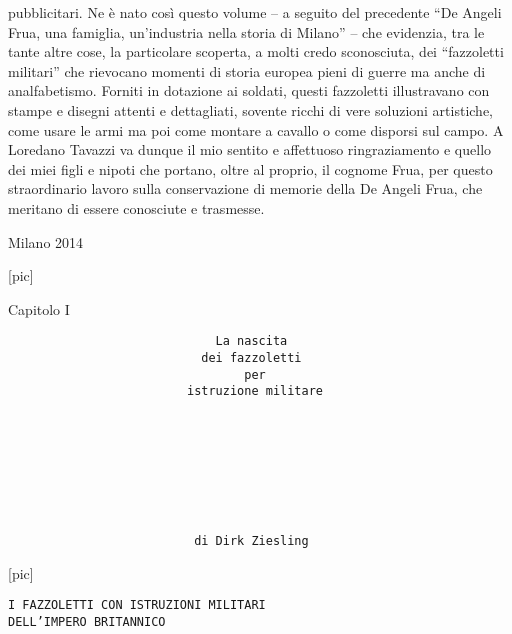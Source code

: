 pubblicitari. Ne è nato così questo volume -- a seguito del precedente
``De Angeli Frua, una famiglia, un'industria nella storia di Milano'' --
che evidenzia, tra le tante altre cose, la particolare scoperta, a molti
credo sconosciuta, dei ``fazzoletti militari'' che rievocano momenti di
storia europea pieni di guerre ma anche di analfabetismo. Forniti in
dotazione ai soldati, questi fazzoletti illustravano con stampe e
disegni attenti e dettagliati, sovente ricchi di vere soluzioni
artistiche, come usare le armi ma poi come montare a cavallo o come
disporsi sul campo. A Loredano Tavazzi va dunque il mio sentito e
affettuoso ringraziamento e quello dei miei figli e nipoti che portano,
oltre al proprio, il cognome Frua, per questo straordinario lavoro sulla
conservazione di memorie della De Angeli Frua, che meritano di essere
conosciute e trasmesse.

Milano 2014

{[}pic{]}

Capitolo I

\begin{verbatim}
                             La nascita
                           dei fazzoletti
                                 per
                         istruzione militare








                          di Dirk Ziesling
\end{verbatim}

{[}pic{]}

\begin{verbatim}
I FAZZOLETTI CON ISTRUZIONI MILITARI
DELL’IMPERO BRITANNICO
\end{verbatim}

